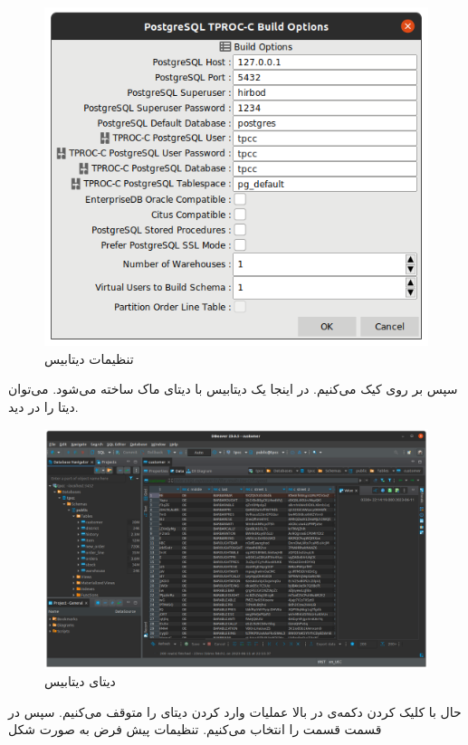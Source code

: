 \begin{figure}[H]
    \centering
    \includegraphics[scale=1]{pictures/hammerdb/init.png}
    \caption{تنظیمات دیتابیس}
\end{figure}
سپس بر روی
کیک می‌کنیم. در اینجا یک دیتابیس با دیتای ماک ساخته می‌شود. می‌توان دیتا را در
دید.
\begin{figure}[H]
    \centering
    \includegraphics[scale=1]{pictures/hammerdb/dbeaver.png}
    \caption{دیتای دیتابیس}
\end{figure}
حال با کلیک کردن دکمه‌ی
در بالا عملیات وارد کردن دیتای
را متوقف می‌کنیم. سپس در قسمت
قسمت
را انتخاب می‌کنیم. تنظیمات پیش فرض به صورت شکل
